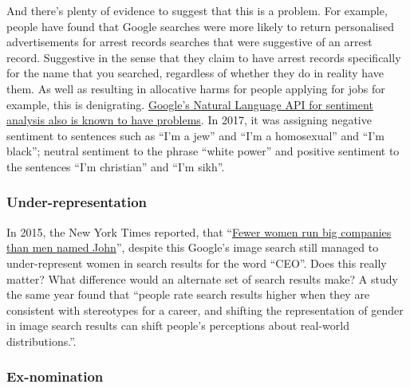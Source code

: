 And there's plenty of evidence to suggest that this is a problem. For example, people have found that Google searches were more likely to return personalised advertisements for arrest records searches that were suggestive of an arrest record\cite{LatanyaSweeney}. Suggestive in the sense that they claim to have arrest records specifically for the name that you searched, regardless of whether they do in reality have them. As well as resulting in allocative harms for people applying for jobs for example, this is denigrating. \href{https://www.vice.com/en_us/article/j5jmj8/google-artificial-intelligence-bias}{Google's Natural Language API for sentiment analysis also is known to have problems}. In 2017, it was assigning negative sentiment to sentences such as ``I'm a jew'' and ``I'm a homosexual'' and ``I'm black''; neutral sentiment to the phrase ``white power'' and positive sentiment to the sentences ``I'm christian'' and ``I'm sikh''.

\subsubsection*{Under-representation}

In 2015, the New York Times reported, that ``\href{https://www.nytimes.com/2015/03/03/upshot/fewer-women-run-big-companies-than-men-named-john.html}{Fewer women run big companies than men named John}'', despite this Google's image search still managed to under-represent women in search results for the word ``CEO''. Does this really matter? What difference would an alternate set of search results make? A study the same year found that ``people rate search results higher when they are consistent with stereotypes for a career, and shifting the representation of gender in image search results can shift people’s perceptions about real-world distributions.''\cite{OccupationImageSearch}.

\subsubsection*{Ex-nomination}

